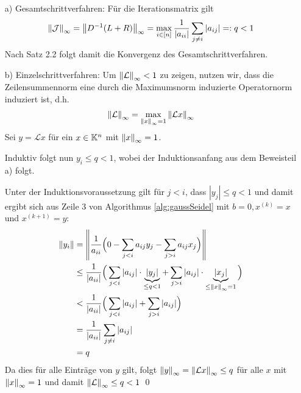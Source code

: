 \begin{enumerate}
  \item[a)] 
  Gesamtschrittverfahren: Für die Iterationsmatrix gilt
  \begin{align*}
    \vertn{2}{\mathcal{J}}_\infty 
    = \vertn{2}{D^{-1}(L+R)}_\infty 
    = \max_{i\in[n]}\dfrac{1}{|a_{ii}|}\sum_{j\neq i}|a_{ij}| 
    =: q < 1
  \end{align*}
  Nach Satz 2.2 folgt damit die Konvergenz des Gesamtschrittverfahren.
  \item[b)] Einzelschrittverfahren: Um $\vertn{2}{\mathcal{L}}_\infty < 1$ zu zeigen, nutzen wir, 
  dass die Zeilensummennorm eine durch die Maximumsnorm induzierte Operatornorm induziert ist, d.h.
  \begin{align*}
    \vertn{2}{\mathcal{L}}_\infty 
    = \max_{\vertn{2}{x}_\infty = 1} \vertn{2}{\mathcal{L}x}_\infty
  \end{align*}
  Sei $y=\mathcal{L}x$ für ein $x\in\mathbb K^n$ mit $\vertn{2}{x}_\infty=1$. 

  Induktiv folgt nun $y_i \leq q < 1$, wobei der Induktionsanfang aus dem Beweisteil a) folgt. 

  Unter der Induktionsvoraussetzung gilt für $j<i$, dass $|y_j|\leq q<1$ und damit ergibt sich aus Zeile 3 von 
  Algorithmus \ref{alg:gaussSeidel} mit $b=0, x^{(k)}=x$ und $x^{(k+1)}=y$:
  \begin{align*}
    \vertn{2}{y_i} 
    & = \vertn{2}{\dfrac{1}{a_{ii}}\Big(0 - \sum_{j<i}a_{ij}y_j-\sum_{j>i}a_{ij}x_j\Big)}\\
    &\leq \dfrac{1}{|a_{ii}|}\Big(\sum_{j<i}|a_{ij}|\cdot\underbrace{|y_j|}_{\leq q<1}
    +\sum_{j>i}|a_{ij}|\cdot\underbrace{|x_j|}_{\leq \vertn{2}{x}_\infty=1}\Big) \\
    & < \dfrac{1}{|a_{ii}|}\Big(\sum_{j<i}|a_{ij}|+\sum_{j>i}|a_{ij}|\Big) \\
    & = \dfrac{1}{|a_{ii}|}\sum_{j\neq i} |a_{ij}| \\
    & = q
  \end{align*}
  Da dies für alle Einträge von $y$ gilt, folgt $\vertn{2}{y}_\infty = \vertn{2}{\mathcal{L}x}_\infty \leq q$ für 
  alle $x$ mit $\vertn{2}{x}_\infty=1$ und damit $\vertn{2}{\mathcal{L}}_\infty \leq q < 1$ 
  \qed
\end{enumerate}

